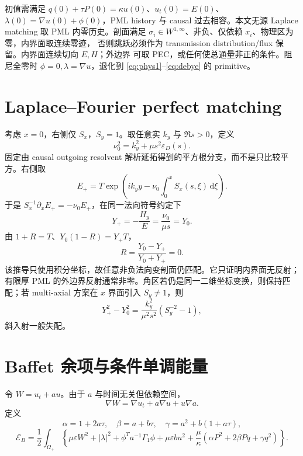 \documentclass[UTF8,a4paper,11pt]{ctexart}
\newcommand{\dd}{\,\mathrm d}
\newcommand{\E}{\mathcal E}
\newcommand{\Om}{\Omega}
\newcommand{\ep}{\varepsilon}
\begin{document}
初值需满足 $q(0)+\tau P(0)=\kappa u(0)$、$u_t(0)=E(0)$、
$\lambda(0)=\nabla u(0)+\phi(0)$，PML history 与 causal 过去相容。本文无源
Laplace matching 取 PML 内零历史。剖面满足
$\sigma_i\in W^{1,\infty}$、非负、仅依赖 $x_i$、物理区为零，内界面取连续零迹，
否则跳跃必须作为 transmission distribution/flux 保留。内界面连续切向 $E,H$；外边界
可取 PEC，或任何使总通量非正的条件。阻尼全零时 $\phi=0,\lambda=\nabla u$，退化到
\eqref{eq:phys1}--\eqref{eq:debye} 的 primitive。

\section{Laplace--Fourier perfect matching}

考虑 $x=0$，右侧仅 $S_x$，$S_y=1$。取任意实 $k_y$ 与 $\Re s>0$，定义
\[
 \nu_0^2=k_y^2+\mu s^2\ep_D(s).
\]
固定由 causal outgoing resolvent 解析延拓得到的平方根分支，而不是只比较平方。右侧取
\[
 E_+=T\exp\left(ik_yy-\nu_0\int_0^xS_x(s,\xi)\dd\xi\right).
\]
于是 $S_x^{-1}\partial_xE_+=-\nu_0E_+$，在同一法向符号约定下
\[
 Y_+=-\frac{H_y}E=\frac{\nu_0}{\mu s}=Y_0.
\]
由 $1+R=T$、$Y_0(1-R)=Y_+T$，
\[
 R=\frac{Y_0-Y_+}{Y_0+Y_+}=0.
\]
该推导只使用积分坐标，故任意非负法向变剖面仍匹配。它只证明内界面无反射；有限厚
PML 的外边界反射通常非零。角区若仍是同一二维坐标变换，则保持匹配；若 multi-axial
方案在 $x$ 界面引入 $S_y\ne1$，则
\[
 Y_+^2-Y_0^2=\frac{k_y^2}{\mu^2s^2}(S_y^{-2}-1),
\]
斜入射一般失配。

\section{Baffet 余项与条件单调能量}

令 $W=u_t+au$。由于 $a$ 与时间无关但依赖空间，
\begin{equation}\label{eq:product}
 \nabla W=\nabla u_t+a\nabla u+u\nabla a.
\end{equation}
定义
\[
 \alpha=1+2a\tau,\quad\beta=a+b\tau,\quad
 \gamma=a^2+b(1+a\tau),
\]
\begin{equation}\label{eq:EB}
\E_B=\frac12\int_{\Om_+}\left\{
 \mu\ep W^2+|\lambda|^2+\phi^Ta^{-1}\Gamma_1\phi+\mu\ep b u^2
 +\frac\mu\kappa(\alpha P^2+2\beta Pq+\gamma q^2)\right\}.
\end{equation}
\end{document}
